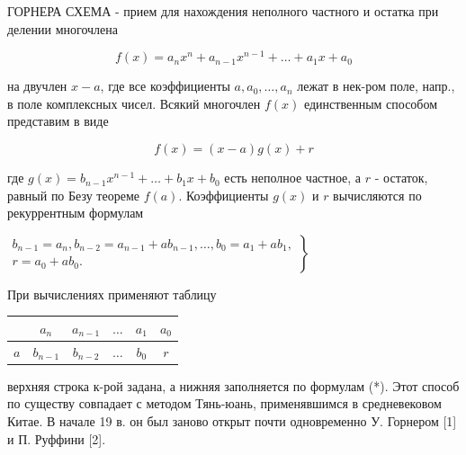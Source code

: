 \documentclass[10pt]{article}
\begin{document}
ГОРНЕРА СХЕМА - прием для нахождения неполного частного и остатка при делении многочлена



\[

f(x)=a_{n} x^{n}+a_{n-1} x^{n-1}+\ldots+a_{1} x+a_{0}

\]



на двучлен $x-a$, где все коэффициенты $a, a_{0}, \ldots, a_{n}$ лежат в нек-ром поле, напр., в поле комплексных чисел. Всякий многочлен $f(x)$ единственным способом представим в виде



\[

f(x)=(x-a) g(x)+r

\]



где $g(x)=b_{n-1} x^{n-1}+\ldots+b_{1} x+b_{0}$ есть неполное частное, а $r$ - остаток, равный по Безу теореме $f(a)$. Коэффициенты $g(x)$ и $r$ вычисляются по рекуррентным формулам



$\left.\begin{array}{l}b_{n-1}=a_{n}, b_{n-2}=a_{n-1}+a b_{n-1}, \ldots, b_{0}=a_{1}+a b_{1}, \\ r=a_{0}+a b_{0} .\end{array}\right\}$



При вычислениях применяют таблицу



\begin{center}

\begin{tabular}{c|c|c|c|c|c|}

\hline

\multicolumn{1}{c|}{} & $a_{n}$ & $a_{n-1}$ & $\ldots$ & $a_{1}$ & $a_{0}$ \\

\hline

$a$ & $b_{n-1}$ & $b_{n-2}$ & $\ldots$ & $b_{0}$ & $r$ \\

\hline

\end{tabular}

\end{center}



верхняя строка к-рой задана, а нижняя заполняется по формулам (*). Этот способ по существу совпадает с методом Тянь-юань, применявшимся в средневековом Китае. В начале 19 в. он был заново открыт почти одновременно У. Горнером [1] и П. Руффини [2].
\end{document}
